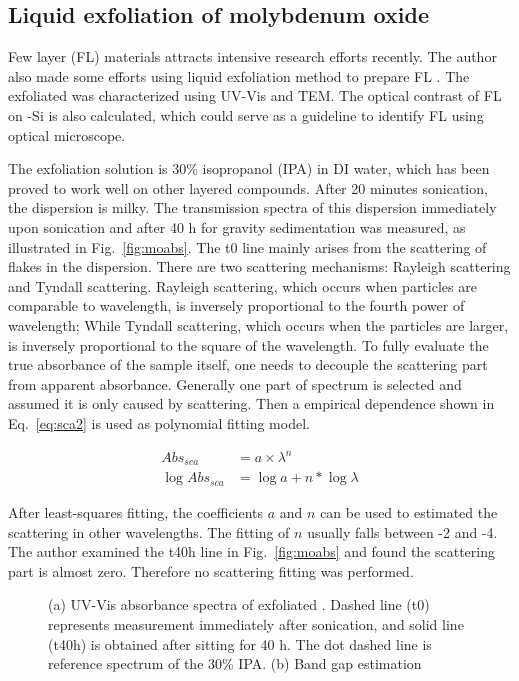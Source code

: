\subsection{Liquid exfoliation of molybdenum oxide}

Few layer (FL) materials attracts intensive research efforts recently. The author also made some efforts using liquid exfoliation method to prepare FL . The exfoliated  was characterized using UV-Vis and TEM. The optical contrast of FL  on -Si is also calculated, which could serve as a guideline to identify FL  using optical microscope.

The exfoliation solution is 30\% isopropanol (IPA) in DI water, which has been proved to work well on other layered compounds.\cite{Halim2013} After 20 minutes sonication, the dispersion is milky. The transmission spectra of this dispersion immediately upon sonication and after 40 h for gravity sedimentation was measured, as illustrated in Fig.~\ref{fig:moabs}. The t0 line mainly arises from the scattering of flakes in the dispersion. There are two scattering mechanisms: Rayleigh scattering and Tyndall scattering. Rayleigh scattering, which occurs when particles are comparable to wavelength, is inversely proportional to the fourth power of wavelength; While Tyndall scattering, which occurs when the particles are larger, is inversely proportional to the square of the wavelength. To fully evaluate the true absorbance of the sample itself, one needs to decouple the scattering part from apparent absorbance. Generally  one part of spectrum is selected and assumed it is only caused by scattering. Then a empirical dependence shown in Eq.~\ref{eq:sca2} is used as polynomial fitting model.

\begin{align}
Abs_{sca}  & = a\times \lambda^{n}  \label{eq:sca1}\\
\log{Abs_{sca}} & = \log{a} + n*\log{\lambda} \label{eq:sca2}
\end{align}

After least-squares fitting, the coefficients $a$ and $n$ can be used to estimated the scattering in other wavelengths. The fitting of $n$ usually falls between -2 and -4. The author examined the t40h line in Fig.~\ref{fig:moabs} and found the scattering part is almost zero. Therefore no scattering fitting was performed.

\begin{figure}[htb]
\centering
{}\hspace{0.04\textwidth}
\caption[UV-Vis spectra of exfoliated ]{(a) UV-Vis absorbance spectra of exfoliated . Dashed line (t0) represents measurement immediately after sonication, and solid line (t40h) is obtained after sitting for 40 h. The dot dashed line is reference spectrum of the 30\% IPA. (b) Band gap estimation}
\label{fig:mouv}
\end{figure}

